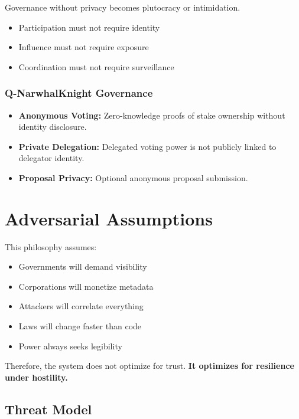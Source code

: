 \documentclass[12pt,a4paper]{article}
\begin{document}
Governance without privacy becomes plutocracy or intimidation.

\begin{itemize}
    \item Participation must not require identity
    \item Influence must not require exposure
    \item Coordination must not require surveillance
\end{itemize}

\subsubsection{Q-NarwhalKnight Governance}

\begin{itemize}
    \item \textbf{Anonymous Voting:} Zero-knowledge proofs of stake ownership without identity disclosure.
    \item \textbf{Private Delegation:} Delegated voting power is not publicly linked to delegator identity.
    \item \textbf{Proposal Privacy:} Optional anonymous proposal submission.
\end{itemize}

\section{Adversarial Assumptions}

This philosophy assumes:
\begin{itemize}
    \item Governments will demand visibility
    \item Corporations will monetize metadata
    \item Attackers will correlate everything
    \item Laws will change faster than code
    \item Power always seeks legibility
\end{itemize}

Therefore, the system does not optimize for trust. \textbf{It optimizes for resilience under hostility.}

\subsection{Threat Model}
\end{document}
